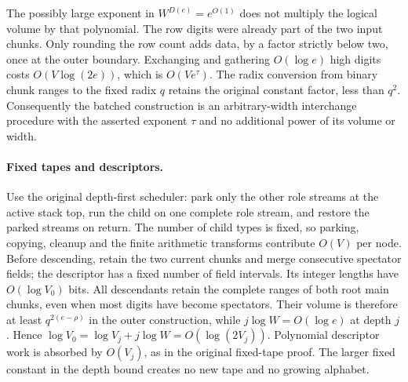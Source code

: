 The possibly large exponent in $W^{D(e)}=e^{O(1)}$ does not multiply the
logical volume by that polynomial.  The row digits were already part of
the two input chunks.  Only rounding the row count adds data, by a factor
strictly below two, once at the outer boundary.  Exchanging and gathering
$O(\log e)$ high digits costs $O(V\log(2e))$, which is
$O(Ve^\tau)$.  The radix conversion from binary chunk ranges to the fixed
radix $q$ retains the original constant factor, less than $q^2$.
Consequently the batched construction is an arbitrary-width interchange
procedure with the asserted exponent $\tau$ and no additional power of
its volume or width.

\paragraph{Fixed tapes and descriptors.}
Use the original depth-first scheduler: park only the other role streams
at the active stack top, run the child on one complete role stream, and
restore the parked streams on return.  The number of child types is
fixed, so parking, copying, cleanup and the finite arithmetic transforms
contribute $O(V)$ per node.  Before descending, retain the two current
chunks and merge consecutive spectator fields; the descriptor has a fixed
number of field intervals.  Its integer lengths have $O(\log V_0)$ bits.
All descendants retain the complete ranges of both root main chunks,
even when most digits have become spectators.  Their volume is therefore
at least $q^{2(e-\rho)}$ in the outer construction, while
$j\log W=O(\log e)$ at depth $j$.  Hence
$\log V_0=\log V_j+j\log W=O(\log(2V_j))$.
Polynomial descriptor work is absorbed by $O(V_j)$, as in the original
fixed-tape proof.  The larger fixed constant in the depth bound creates
no new tape and no growing alphabet.

